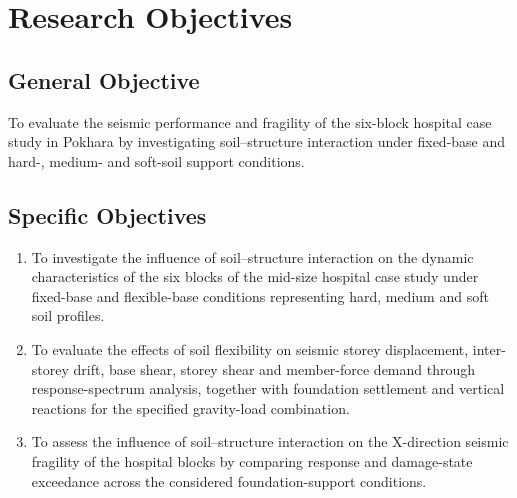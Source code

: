 \section{Research Objectives}
\subsection*{General Objective}
To evaluate the seismic performance and fragility of the six-block hospital case study in Pokhara by investigating soil--structure interaction under fixed-base and hard-, medium- and soft-soil support conditions.

\subsection*{Specific Objectives}
\begin{enumerate}
\item To investigate the influence of soil--structure interaction on the dynamic characteristics of the six blocks of the mid-size hospital case study under fixed-base and flexible-base conditions representing hard, medium and soft soil profiles.
\item To evaluate the effects of soil flexibility on seismic storey displacement, inter-storey drift, base shear, storey shear and member-force demand through response-spectrum analysis, together with foundation settlement and vertical reactions for the specified gravity-load combination.
\item To assess the influence of soil--structure interaction on the X-direction seismic fragility of the hospital blocks by comparing response and damage-state exceedance across the considered foundation-support conditions.
\end{enumerate}
